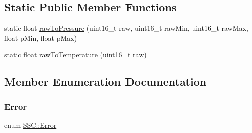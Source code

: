 \subsection*{Static Public Member Functions}
\begin{DoxyCompactItemize}
\item 
static float \hyperlink{class_s_s_c_ad69ac5f79eea773ecad17b79c255da1d}{raw\+To\+Pressure} (uint16\+\_\+t raw, uint16\+\_\+t raw\+Min, uint16\+\_\+t raw\+Max, float p\+Min, float p\+Max)
\item 
static float \hyperlink{class_s_s_c_a0e037164770fcffaef6386e13fdbec95}{raw\+To\+Temperature} (uint16\+\_\+t raw)
\end{DoxyCompactItemize}


\subsection{Member Enumeration Documentation}
\mbox{\label{class_s_s_c_a63403d830673dc853c121d05b72d6ea4}} 
\subsubsection{\texorpdfstring{Error}{Error}}
{\footnotesize\ttfamily enum \hyperlink{class_s_s_c_a63403d830673dc853c121d05b72d6ea4}{S\+S\+C\+::\+Error}}

